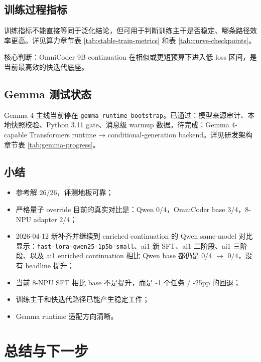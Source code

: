 \documentclass[11pt,a4paper]{article}
\newcommand{\code}[1]{\begingroup\ttfamily\footnotesize\nolinkurl{#1}\endgroup}
\begin{document}
\subsection{训练过程指标}

训练指标不能直接等同于泛化结论，但可用于判断训练主干是否稳定、哪条路径效率更高。详见算力章节表 \ref{tab:stable-train-metrics} 和表 \ref{tab:curve-checkpoints}。

核心判断：OmniCoder 9B continuation 在相似或更短预算下进入低 loss 区间，是当前最高效的快迭代底座。

\subsection{Gemma 测试状态}

Gemma 4 主线当前停在 \code{gemma\_runtime\_bootstrap}。已通过：模型来源审计、本地快照校验、Python 3.11 gate、消息级 warmup 数据。待完成：Gemma 4-capable Transformers runtime → conditional-generation backend。详见研发架构章节表 \ref{tab:gemma-progress}。

\subsection{小结}

\begin{itemize}
  \item 参考解 26/26，评测地板可靠；
  \item 严格量子 override 目前的真实对比是：Qwen 0/4，OmniCoder base 3/4，8-NPU adapter 2/4；
  \item 2026-04-12 新补齐并继续到 enriched continuation 的 Qwen same-model 对比显示：\code{fast-lora-qwen25-1p5b-small}、ai1 新 SFT、ai1 二阶段、ai1 三阶段、以及 ai1 enriched continuation 相比 Qwen base 都仍是 0/4 $\rightarrow$ 0/4，没有 headline 提升；
  \item 当前 8-NPU SFT 相比 base 不是提升，而是 -1 个任务 / -25pp 的回退；
  \item 训练主干和快迭代路径已能产生稳定工件；
  \item Gemma runtime 适配方向清晰。
\end{itemize}

\clearpage

\section{总结与下一步}

\noindent{}
\end{document}

